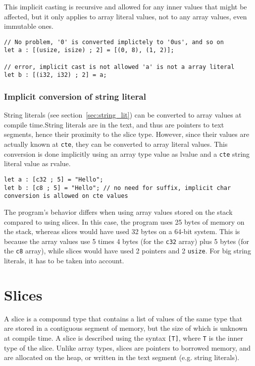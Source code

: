 This implicit casting is recursive and allowed for any inner values that might
be affected, but it only applies to array literal values, not to any array
values, even immutable ones.

\begin{lstlisting}[style=coloredverbatim]
// No problem, '0' is converted implictely to '0us', and so on
let a : [(usize, isize) ; 2] = [(0, 8), (1, 2)];

// error, implicit cast is not allowed 'a' is not a array literal
let b : [(i32, i32) ; 2] = a;
\end{lstlisting}

\subsubsection{Implicit conversion of string literal}

String literals (see section~\ref{sec:string_lit}) can be converted to array
values at compile time.String literals are in the text, and thus are pointers to
text segments, hence their proximity to the slice type. However, since their
values are actually known at \texttt{cte}, they can be converted to array
literal values. This conversion is done implicitly using an array type value as
lvalue and a \texttt{cte} string literal value as rvalue.

\begin{lstlisting}[style=coloredverbatim]
let a : [c32 ; 5] = "Hello";
let b : [c8 ; 5] = "Hello"; // no need for suffix, implicit char conversion is allowed on cte values
\end{lstlisting}

The program's behavior differs when using array values stored on the stack
compared to using slices. In this case, the program uses 25 bytes of memory on
the stack, whereas slices would have used 32 bytes on a 64-bit system. This is
because the array values use 5 times 4 bytes (for the \texttt{c32} array) plus 5
bytes (for the \texttt{c8} array), while slices would have used 2 pointers and 2
\texttt{usize}. For big string literals, it has to be taken into account.

\section{Slices}%
\label{sec:slices}

A slice is a compound type that contains a list of values of the same type that
are stored in a contiguous segment of memory, but the size of which is unknown
at compile time. A slice is described using the syntax \texttt{[T]}, where
\texttt{T} is the inner type of the slice. Unlike array types, slices are
pointers to borrowed memory, and are allocated on the heap, or written in the
text segment (e.g. string literals).

